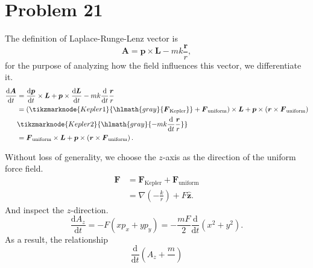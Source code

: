 \section*{Problem 21}

    The definition of Laplace-Runge-Lenz vector is
    \begin{equation}
        \boldsymbol{A} = \boldsymbol{p} \times \boldsymbol{L} -mk\frac{\boldsymbol{r}}{r},
    \end{equation}
    for the purpose of analyzing how the field influences this vector, we differentiate it.
    \begin{align}
        \frac{\mathrm{d}\boldsymbol{A}}{\mathrm{d}t} &= \frac{\mathrm{d}\boldsymbol{p}}{\mathrm{d}t}\times\boldsymbol{L} + \boldsymbol{p}\times\frac{\mathrm{d}\boldsymbol{L}}{\mathrm{d}t} - mk\frac{\mathrm{d}}{\mathrm{d}t}\frac{\boldsymbol{r}}{r}\nonumber
        \\
        & = \left( \tikzmarknode{Kepler1}{\hlmath{gray}{\boldsymbol{F}_{\text{Kepler}}}} + \boldsymbol{F}_{\text{uniform}} \right)\times\boldsymbol{L} + \boldsymbol{p}\times\left(\boldsymbol{r}\times\boldsymbol{F}_{\text{uniform}}\right)\nonumber
        \\
        &\tikzmarknode{Kepler2}{\hlmath{gray}{- mk\frac{\mathrm{d}}{\mathrm{d}t}\frac{\boldsymbol{r}}{r}}}\nonumber
        \\
        & = \boldsymbol{F}_{\text{uniform}}\times\boldsymbol{L} + \boldsymbol{p}\times\left(\boldsymbol{r}\times\boldsymbol{F}_{\text{uniform}}\right).
    \end{align}

    Without loss of generality, we choose the $z$-axis as the direction of the uniform force field.
    \begin{align}
        \boldsymbol{F} &= \boldsymbol{F}_{\text{Kepler}} + \boldsymbol{F}_{\text{uniform}}\nonumber
        \\
        & = \nabla(-\frac{k}{r}) + F\hat{\boldsymbol{z}}.
    \end{align}
    And inspect the $z$-direction.
    \begin{equation}
        \frac{\mathrm{d}A_z}{\mathrm{d}t} = -F\left(xp_x+yp_y\right)=-\frac{mF}{2}\frac{\mathrm{d}}{\mathrm{d}t}\left(x^2+y^2\right).
    \end{equation}
    As a result, the relationship
    \begin{equation}
        \frac{\mathrm{d}}{\mathrm{d}t}\left(A_z+\frac{m}{}\right)
    \end{equation}